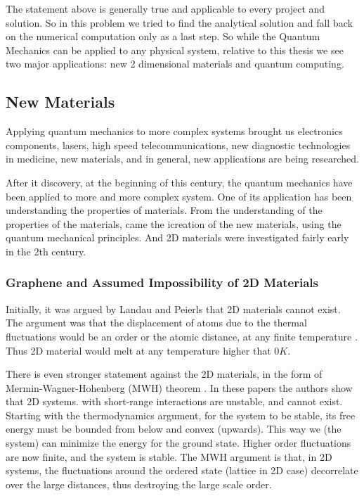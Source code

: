 The statement above is generally true and applicable to every project and solution. So in this problem we tried to find the analytical solution and fall back on the numerical computation only as a last step. So while the Quantum Mechanics can be applied to any physical system, relative to this thesis we see two major applications: new 2 dimensional materials and quantum computing.

\subsection*{New Materials}

Applying quantum mechanics to more complex systems brought us electronics components, lasers, high speed telecommunications, new diagnostic technologies in medicine, new materials, and in general, new applications are being researched.

After it discovery, at the beginning of this century, the quantum mechanics have been applied to more and more complex system. One of its application has been understanding the properties of materials.
From the understanding of the properties of the materials, came the icreation of the new materials, using the quantum mechanical principles. And 2D materials were investigated fairly early in the 2th century.

\subsubsection{Graphene and Assumed Impossibility of 2D Materials}

Initially, it was argued by Landau and Peierls \cite{LandauG}\cite{Pierls} that 2D materials cannot exist. The argument was that the displacement of atoms due to the thermal fluctuations would be an order or the atomic distance, at any finite temperature \cite{LandauG, Pierls}. Thus 2D material would melt at any temperature higher that $ 0 K $. 

There is even stronger statement against the 2D materials, in the form of Mermin-Wagner-Hohenberg (MWH) theorem \cite{Hohenberg}\cite{Mermin2}. In these papers the authors show that 2D systems. with short-range interactions are unstable, and cannot exist. 
Starting with the thermodynamics argument, for the system to be stable, its free energy must be bounded from below and convex (upwards). This way we (the system) can minimize the energy for the ground state. Higher order fluctuations are now finite, and the system is stable.
The MWH argument is that, in 2D systems, the fluctuations around the ordered state (lattice in 2D case) decorrelate over the large distances, thus destroying the large scale order. 

